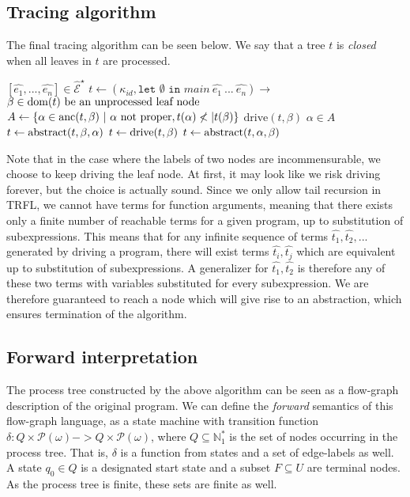 \documentclass[10pt]{../sigplanconf}
\newcommand{\dom}{\ensuremath{{\rm dom}}}
\newcommand{\anc}{\ensuremath{{\rm anc}}}
\newcommand{\gen}{\ensuremath{~{\leq\kern-6pt \raisebox{1pt}{$\cdot$}}~}}
\begin{document}
\subsection{Tracing algorithm}
The final tracing algorithm can be seen below. We say that a tree $t$
is \emph{closed} when all leaves in $t$ are processed.
\begin{algorithmic}
   $[\widehat{e_1}, ..., \widehat{e_n}] \in \widehat{\mathcal{E}}^\star$
  \STATE $t\gets (\kappa_{id}, \texttt{let $\emptyset$ in $main~\widehat{e_1}~...~\widehat{e_n}$})\rightarrow$
    $\beta\in\dom(t) \text{ be an unprocessed leaf node}$
    \STATE $A\gets\{ \alpha\in\anc(t,\beta) ~|~ \alpha\text{ not proper}, t(\alpha) \not<| t(\beta)  \}$
      \STATE $\textrm{drive}(t,\beta)$
    \ELSE
      $\alpha \in A$
      \IF{$t_\mathcal{L}(\alpha) \gen t_\mathcal{L}(\beta)$}
       \STATE $t\gets {\rm abstract}(t,\beta,\alpha)$
        \STATE $t\gets {\rm drive}(t,\beta)$
      \ELSE
        \STATE $t\gets {\rm abstract}(t,\alpha,\beta)$
      \ENDIF
    \ENDIF
  \ENDWHILE
\end{algorithmic}

Note that in the case where the labels of two nodes are
incommensurable, we choose to keep driving the leaf node. At first, it
may look like we risk driving forever, but the choice is actually
sound. Since we only allow tail recursion in TRFL, we cannot have
terms for function arguments, meaning that there exists only a finite
number of reachable terms for a given program, up to substitution of
subexpressions. This means that for any infinite sequence of terms
$\widehat{t_1},\widehat{t_2},...$ generated by driving a program,
there will exist terms $\widehat{t_i},\widehat{t_j}$ which are
equivalent up to substitution of subexpressions. A generalizer for
$\widehat{t_1},\widehat{t_2}$ is therefore any of these two terms with
variables substituted for every subexpression. We are therefore
guaranteed to reach a node which will give rise to an abstraction,
which ensures termination of the algorithm.

\subsection{Forward interpretation}
The process tree constructed by the above algorithm can be seen as a
flow-graph description of the original program. We can define the
\textit{forward} semantics of this flow-graph language, as a state
machine with transition function $\delta : Q \times
\mathcal{P}(\omega) -> Q \times \mathcal{P}(\omega)$, where $Q
\subseteq \mathbb{N}^{*}_1$ is the set of nodes occurring in the
process tree. That is, $\delta$ is a function from states and a set of
edge-labels as well.  A state $q_0 \in Q$ is a designated start state
and a subset $F \subseteq U$ are terminal nodes. As the process tree
is finite, these sets are finite as well.
\end{document}

